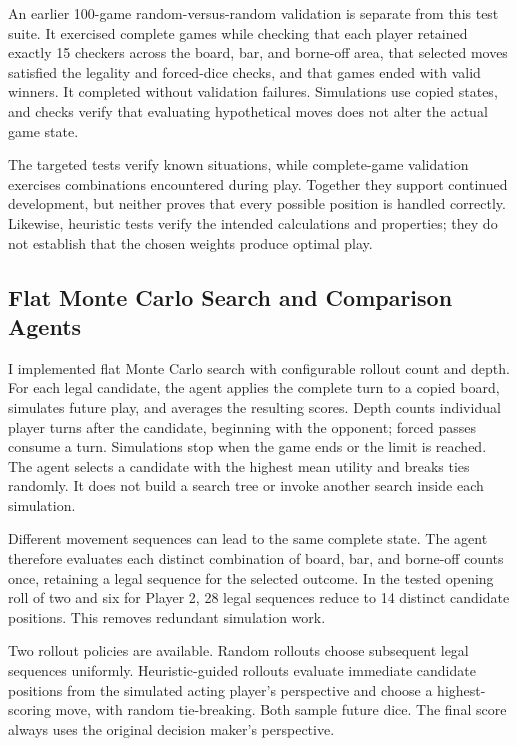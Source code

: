 \documentclass[12pt,twoside]{article}
\begin{document}
An earlier 100-game random-versus-random validation is separate from this test
suite. It exercised complete games while checking that each player retained
exactly 15 checkers across the board, bar, and borne-off area, that selected
moves satisfied the legality and forced-dice checks, and that games ended with
valid winners. It completed without validation failures. Simulations use copied
states, and checks verify that evaluating hypothetical moves does not alter the
actual game state.

The targeted tests verify known situations, while complete-game validation
exercises combinations encountered during play. Together they support continued
development, but neither proves that every possible position is handled
correctly. Likewise, heuristic tests verify the intended calculations and
properties; they do not establish that the chosen weights produce optimal play.


\subsection{Flat Monte Carlo Search and Comparison Agents}

I implemented flat Monte Carlo search with configurable rollout count and depth.
For each legal candidate, the agent applies the complete turn to a copied board,
simulates future play, and averages the resulting scores. Depth counts individual
player turns after the candidate, beginning with the opponent; forced passes
consume a turn. Simulations stop when the game ends or the limit is reached.
The agent selects a candidate with the highest mean utility and breaks ties
randomly. It does not build a search tree or invoke another search inside each
simulation.

Different movement sequences can lead to the same complete state. The agent
therefore evaluates each distinct combination of board, bar, and borne-off
counts once, retaining a legal sequence for the selected outcome. In the tested
opening roll of two and six for Player 2, 28 legal sequences reduce to 14 distinct
candidate positions. This removes redundant simulation work.

Two rollout policies are available. Random rollouts choose subsequent legal
sequences uniformly. Heuristic-guided rollouts evaluate immediate candidate
positions from the simulated acting player's perspective and choose a
highest-scoring move, with random tie-breaking. Both sample future dice. The
final score always uses the original decision maker's perspective.
\end{document}
